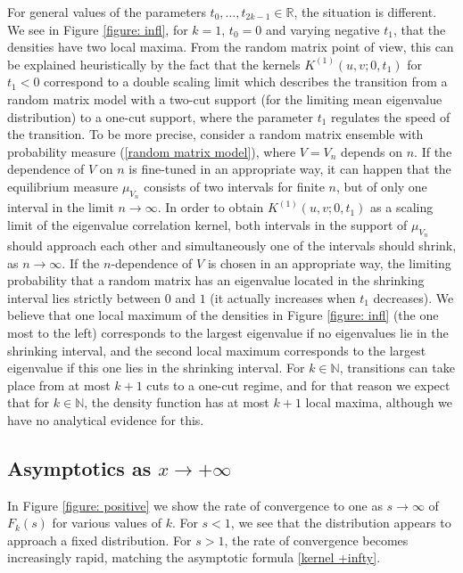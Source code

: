 \documentclass[11pt,fleqn]{article}
\numberwithin{equation}{section}
\begin{document}
For general values of the parameters $t_0,\ldots,t_{2k-1}\in\mathbb
R$, the situation is different. We see in Figure \ref{figure: infl},
for $k=1$, $t_0=0$ and varying negative $t_1$, that the densities
have two local maxima. From the random matrix point of view, this
can be explained heuristically by the fact that the kernels
$K^{(1)}(u,v;0,t_1)$ for $t_1<0$ correspond to a double scaling
limit which describes the transition from a random matrix model with a
two-cut support (for the limiting mean eigenvalue distribution) to a
one-cut support, where the parameter $t_1$ regulates the speed of
the transition. To be more precise, consider a random matrix
ensemble with probability measure (\ref{random matrix model}), where
$V=V_n$ depends on $n$. If the dependence of $V$ on $n$ is
fine-tuned in an appropriate way, it can happen that the equilibrium
measure $\mu_{V_n}$ consists of two intervals for finite $n$, but of
only one interval in the limit $n\to\infty$. In order to obtain
$K^{(1)}(u,v;0,t_1)$ as a scaling limit of the eigenvalue
correlation kernel, both intervals in the support of $\mu_{V_n}$
should approach each other and simultaneously one of the intervals
should shrink, as $n\to\infty$. If the $n$-dependence of $V$ is
chosen in an appropriate way, the limiting probability that a random
matrix has an eigenvalue located in the shrinking interval lies
strictly between $0$ and $1$ (it actually increases when $t_1$
decreases). We believe that one local maximum of the densities in
Figure \ref{figure: infl} (the one most to the left) corresponds to
the largest eigenvalue if no eigenvalues lie in the shrinking
interval, and the second local maximum corresponds to the largest
eigenvalue if this one lies in the shrinking interval. For
$k\in\mathbb N$, transitions can take place from at most $k+1$ cuts
to a one-cut regime, and for that reason we expect that for
$k\in\mathbb N$, the density function has at most $k+1$ local
maxima, although we have no analytical evidence for this.



\subsection{Asymptotics as $x\to +\infty$}


In Figure \ref{figure: positive} we show the rate of convergence to one as $s \rightarrow \infty$ of $F_k(s)$ for various values of $k$.  For $s < 1$, we see that the distribution appears to approach a fixed distribution.  For $s > 1$, the rate of convergence becomes increasingly rapid, matching the asymptotic formula \eqref{kernel +infty}.
\end{document}
